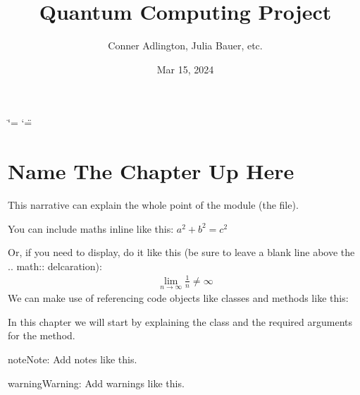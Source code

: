 \documentclass[letterpaper,10pt,english]{sphinxmanual}
\title{Quantum Computing Project}
\date{Mar 15, 2024}
\author{
Conner Adlington, Julia Bauer, etc.\@{} 
}
\begin{document}
\ifdefined\shorthandoff
  \ifnum\catcode`\=\string=\active\shorthandoff{=}\fi
  \ifnum\catcode`\"=\active{}\fi
\fi

\pagestyle{empty}
\sphinxmaketitle
\pagestyle{plain}
\sphinxtableofcontents
\pagestyle{normal}
\label{\detokenize{index::doc}}


\chapter{Name The Chapter Up Here}
\label{\detokenize{index:name-the-chapter-up-here}}\label{\detokenize{index:module-example}}
\sphinxAtStartPar
This narrative can explain the whole point of the module (the file).

\sphinxAtStartPar
You can include maths inline like this: \(a^2 + b^2 = c^2\)

\sphinxAtStartPar
Or, if you need to display, do it like this (be sure to leave a blank line
above the .. math:: delcaration):
\begin{equation*}
\begin{split}\lim_{n\to\infty} \frac{1}{n} \neq \infty\end{split}
\end{equation*}
\sphinxAtStartPar
We can make use of referencing code objects like classes and methods
like this:

\sphinxAtStartPar
In this chapter we will start by explaining the {\hyperref[\detokenize{index:example.Example}]{}} class
and the required arguments for the  method.

\begin{sphinxadmonition}{note}{Note:}
\sphinxAtStartPar
Add notes like this.
\end{sphinxadmonition}

\begin{sphinxadmonition}{warning}{Warning:}
\sphinxAtStartPar
Add warnings like this.
\end{sphinxadmonition}
\end{document}
